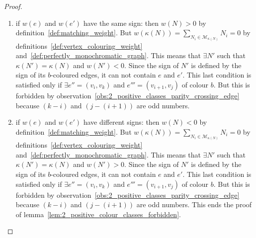 \begin{proof}
    \begin{enumerate}
        \item if $w(e)$ and $w(e')$ have the same sign: then $w(N) > 0$ by definition~\ref{def:matching_weight}.    %
        But $w(\kappa(N)) = \sum\limits_{N_i \in \mathcal{M}_{\kappa(N)}} N_i = 0$ by definitions~\ref{def:vertex_colouring_weight} and~\ref{def:perfectly_monochromatic_graph}.
        This means that $\exists N'$ such that $\kappa(N') = \kappa(N)$ and $w(N') < 0$.
        Since the sign of $N'$ is defined by the sign of its $b$-coloured edges, it can not contain $e$ and $e'$.
        This last condition is satisfied only if $\exists e'' = (v_i, v_k)$ and $e''' = (v_{i+1}, v_j)$ of colour $b$.
        But this is forbidden by observation~\ref{obs:2_positive_classes_parity_crossing_edge} because $(k - i)$ and $\left(j - (i + 1)\right)$ are odd numbers.

        \item if $w(e)$ and $w(e')$ have different signs: then $w(N) < 0$ by definition~\ref{def:matching_weight}.
        But $w(\kappa(N)) = \sum\limits_{N_i \in \mathcal{M}_{\kappa(N)}} N_i = 0$ by definitions~\ref{def:vertex_colouring_weight} and~\ref{def:perfectly_monochromatic_graph}.
        This means that $\exists N'$ such that $\kappa(N') = \kappa(N)$ and $w(N') > 0$.
        Since the sign of $N'$ is defined by the sign of its $b$-coloured edges, it can not contain $e$ and $e'$.
        This last condition is satisfied only if $\exists e'' = (v_i, v_k)$ and $e''' = (v_{i+1}, v_j)$ of colour $b$.
        But this is forbidden by observation~\ref{obs:2_positive_classes_parity_crossing_edge} because $(k - i)$ and $\left(j - (i + 1)\right)$ are odd numbers.
        This ends the proof of lemma~\ref{lem:2_positive_colour_classes_forbidden}.
    \end{enumerate}
\end{proof}
